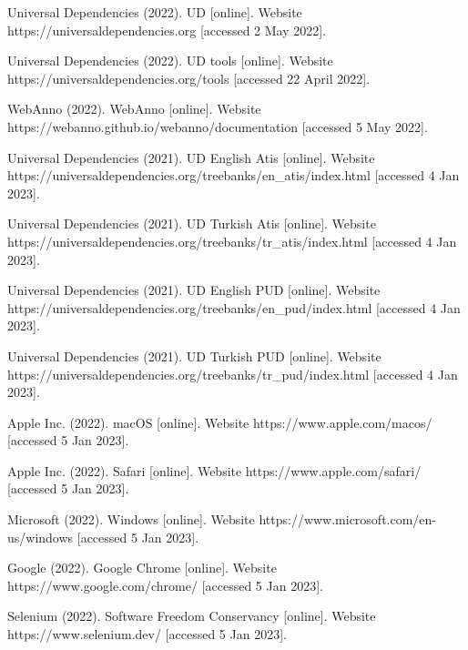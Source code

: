 \documentclass{elektr}
\begin{document}
\begin{thebibliography}{99}
 Universal Dependencies (2022). UD [online]. Website https://universaldependencies.org [accessed 2 May 2022].

 Universal Dependencies (2022). UD tools [online]. Website https://universaldependencies.org/tools [accessed 22 April 2022].

 WebAnno (2022). WebAnno [online]. Website https://webanno.github.io/webanno/documentation [accessed 5 May 2022].

 Universal Dependencies (2021). UD English Atis [online]. Website https://universaldependencies.org/treebanks/en\_atis/index.html [accessed 4 Jan 2023].

 Universal Dependencies (2021). UD Turkish Atis [online]. Website https://universaldependencies.org/treebanks/tr\_atis/index.html [accessed 4 Jan 2023].

 Universal Dependencies (2021). UD English PUD [online]. Website https://universaldependencies.org/treebanks/en\_pud/index.html [accessed 4 Jan 2023].

 Universal Dependencies (2021). UD Turkish PUD [online]. Website https://universaldependencies.org/treebanks/tr\_pud/index.html [accessed 4 Jan 2023].

 Apple Inc. (2022). macOS [online]. Website https://www.apple.com/macos/ [accessed 5 Jan 2023].

 Apple Inc. (2022). Safari [online]. Website https://www.apple.com/safari/ [accessed 5 Jan 2023].

 Microsoft (2022). Windows [online]. Website https://www.microsoft.com/en-us/windows [accessed 5 Jan 2023].

 Google (2022). Google Chrome [online]. Website https://www.google.com/chrome/ [accessed 5 Jan 2023].

 Selenium (2022). Software Freedom Conservancy [online]. Website https://www.selenium.dev/ [accessed 5 Jan 2023].

\end{thebibliography}
\end{document}
